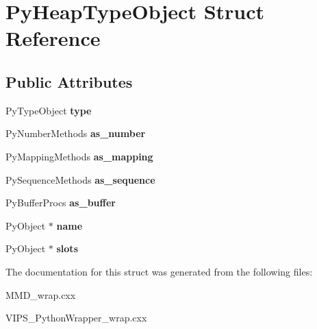 \hypertarget{structPyHeapTypeObject}{}\section{Py\+Heap\+Type\+Object Struct Reference}
\label{structPyHeapTypeObject}
\subsection*{Public Attributes}
\begin{DoxyCompactItemize}
\item 
Py\+Type\+Object {\bfseries type}\hypertarget{structPyHeapTypeObject_a8b961137de4ebeed5a5d2e4b47ee1ca7}{}\label{structPyHeapTypeObject_a8b961137de4ebeed5a5d2e4b47ee1ca7}

\item 
Py\+Number\+Methods {\bfseries as\+\_\+number}\hypertarget{structPyHeapTypeObject_a795de378df40d11321c0dbe463759560}{}\label{structPyHeapTypeObject_a795de378df40d11321c0dbe463759560}

\item 
Py\+Mapping\+Methods {\bfseries as\+\_\+mapping}\hypertarget{structPyHeapTypeObject_a3112d193aea288a92036360bec1ce0a5}{}\label{structPyHeapTypeObject_a3112d193aea288a92036360bec1ce0a5}

\item 
Py\+Sequence\+Methods {\bfseries as\+\_\+sequence}\hypertarget{structPyHeapTypeObject_ad553caad5da3a7004aae1b7ac0289f12}{}\label{structPyHeapTypeObject_ad553caad5da3a7004aae1b7ac0289f12}

\item 
Py\+Buffer\+Procs {\bfseries as\+\_\+buffer}\hypertarget{structPyHeapTypeObject_a026c64b0a5163ea580e79640ecf209de}{}\label{structPyHeapTypeObject_a026c64b0a5163ea580e79640ecf209de}

\item 
Py\+Object $\ast$ {\bfseries name}\hypertarget{structPyHeapTypeObject_a80a37a53a6216edf1744d7480eea2c3d}{}\label{structPyHeapTypeObject_a80a37a53a6216edf1744d7480eea2c3d}

\item 
Py\+Object $\ast$ {\bfseries slots}\hypertarget{structPyHeapTypeObject_a15212a8f85d939b3f4b133ecda1b62e5}{}\label{structPyHeapTypeObject_a15212a8f85d939b3f4b133ecda1b62e5}

\end{DoxyCompactItemize}


The documentation for this struct was generated from the following files\+:\begin{DoxyCompactItemize}
\item 
M\+M\+D\+\_\+wrap.\+cxx\item 
V\+I\+P\+S\+\_\+\+Python\+Wrapper\+\_\+wrap.\+cxx\end{DoxyCompactItemize}
